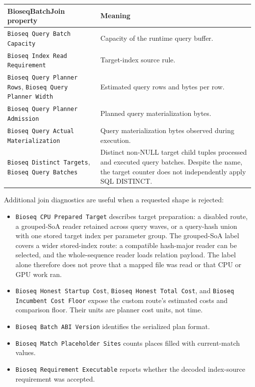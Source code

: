 \begingroup\small
\begin{longtable}{@{}p{.48\linewidth}p{.47\linewidth}@{}}
\toprule
\textbf{BioseqBatchJoin property} & \textbf{Meaning}\\
\midrule\endhead
\texttt{Bioseq Query Batch Capacity} & Capacity of the runtime query buffer.\\
\texttt{Bioseq Index Read Requirement} & Target-index source rule.\\
\texttt{Bioseq Query Planner Rows}, \texttt{Bioseq Query Planner Width}
& Estimated query rows and bytes per row.\\
\texttt{Bioseq Query Planner Admission} & Planned query materialization
bytes.\\
\texttt{Bioseq Query Actual Materialization} & Query materialization bytes
observed during execution.\\
\texttt{Bioseq Distinct Targets}, \texttt{Bioseq Query Batches} & Distinct
non-NULL target child tuples processed and executed query batches. Despite
the name, the target counter does not independently apply SQL DISTINCT.\\
\bottomrule
\end{longtable}
\endgroup

Additional join diagnostics are useful when a requested shape is rejected:
\begin{itemize}
  \item \texttt{Bioseq CPU Prepared Target} describes target preparation:
    a disabled route, a grouped-SoA reader retained across query waves, or a
    query-hash union with one stored target index per parameter group.
    The grouped-SoA label covers a wider stored-index route: a compatible
    hash-major reader can be selected, and the whole-sequence reader loads
    relation payload. The label alone therefore does not prove that a mapped
    file was read or that CPU or GPU work ran.
  \item \texttt{Bioseq Honest Startup Cost},
    \texttt{Bioseq Honest Total Cost}, and
    \texttt{Bioseq Incumbent Cost Floor} expose the custom route's estimated
    costs and comparison floor. Their units are planner cost units, not time.
  \item \texttt{Bioseq Batch ABI Version} identifies the serialized
    plan format.
  \item \texttt{Bioseq Match Placeholder Sites} counts places filled
    with current-match values.
  \item \texttt{Bioseq Requirement Executable} reports whether the decoded
    index-source requirement was accepted.
\end{itemize}


